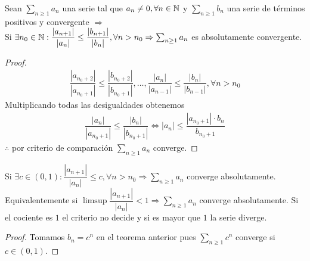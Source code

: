 \begin{theorem}
  Sean \(\sum_{n \geq 1} a_n\) una serie tal que \(a_n \neq 0, \forall n \in \mathbb{N} \) y \(\sum_{n \geq 1} b_n\) una serie de términos positivos y convergente \(\Rightarrow \) \\
  Si \(\exists n_0 \in \mathbb{N} : \dfrac{|a_{n+1}|}{|a_n|} \leq \dfrac{|b_{n+1}|}{|b_n|}, \forall n > n_0 \Rightarrow \sum_{n \geq 1} a_n\) es absolutamente convergente.

  \begin{proof}
    \begin{align*}
      \dfrac{|a_{n_0 + 2}|}{|a_{n_0 + 1}|} \leq \dfrac{|b_{n_0+2}|}{|b_{n_0+1}|}, \ldots, \dfrac{|a_n|}{|a_{n-1}|} \leq \dfrac{|b_n|}{|b_{n-1}|}, \forall n > n_0
    \end{align*}
    Multiplicando todas las desigualdades obtenemos
    \begin{align*}
      \dfrac{|a_n|}{|a_{n_0+1}|} \leq \dfrac{|b_n|}{|b_{n_0+1}|} \iff |a_n| \leq \dfrac{|a_{n_0+1}| \cdot b_n}{b_{n_0+1}}
    \end{align*}
    \(\therefore \) por criterio de comparación \(\sum_{n \geq 1} a_n\) converge.
  \end{proof}
\end{theorem}

\begin{corollary}
  Si \(\exists c \in (0, 1) : \dfrac{|a_{n+1}|}{|a_n|} \leq c, \forall n > n_0 \Rightarrow \sum_{n \geq 1} a_n\) converge absolutamente. \\
  Equivalentemente si \(\limsup \dfrac{|a_{n+1}|}{|a_n|} < 1 \Rightarrow \sum_{n \geq 1} a_n\) converge absolutamente.
  Si el cociente es \(1\) el criterio no decide y si es mayor que \(1\) la serie diverge.
  \begin{proof}
    Tomamos \(b_n = c^n\) en el teorema anterior pues \(\sum_{n \geq 1} c^n\) converge si \(c \in (0 ,1)\).
  \end{proof}
\end{corollary}

